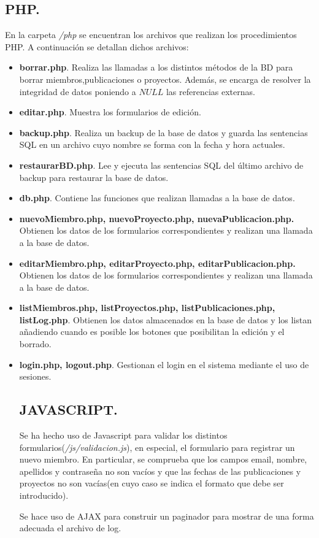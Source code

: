 \documentclass[a4paper, 11pt]{article} %
\begin{document}
\subsection{PHP.}
En la carpeta \emph{/php} se encuentran los archivos que realizan los procedimientos PHP. A continuación se detallan dichos archivos:
\begin{itemize}
	\item \textbf{borrar.php}. Realiza las llamadas a los distintos métodos de la BD para borrar miembros,publicaciones o proyectos. Además, se encarga de resolver la integridad de datos poniendo a $NULL$ las referencias externas. 
	\item \textbf{editar.php}. Muestra los formularios de edición.
	\item \textbf{backup.php}. Realiza un backup de la base de datos y guarda las sentencias SQL en un archivo cuyo nombre se forma con la fecha y hora actuales. 
	\item \textbf{restaurarBD.php}. Lee y ejecuta las sentencias SQL del último archivo de backup para restaurar la base de datos. 
	\item \textbf{db.php}. Contiene las funciones que realizan llamadas a la base de datos.
	\item \textbf{nuevoMiembro.php, nuevoProyecto.php, nuevaPublicacion.php.} Obtienen los datos de los formularios correspondientes y realizan una llamada a la base de datos.
	\item \textbf{editarMiembro.php, editarProyecto.php, editarPublicacion.php.} Obtienen los datos de los formularios correspondientes y realizan una llamada a la base de datos.
    \item \textbf{listMiembros.php, listProyectos.php, listPublicaciones.php, listLog.php}. Obtienen los datos almacenados en la base de datos y los listan añadiendo cuando es posible los botones que posibilitan la edición y el borrado.
    \item \textbf{login.php, logout.php}. Gestionan el login en el sistema mediante el uso de sesiones.
    \subsection{JAVASCRIPT.}
    Se ha hecho uso de Javascript para validar los distintos formularios(\emph{/js/validacion.js}), en especial, el formulario
	para registrar un nuevo miembro. En particular, se comprueba que los campos email, nombre, apellidos y contraseña no son vacíos y que las fechas de las publicaciones y proyectos no son vacías(en cuyo caso se indica el formato que debe ser introducido).
	
	\medskip
	
	Se hace uso de AJAX para construir un paginador para mostrar de una forma adecuada el archivo de log.
\end{itemize}
\end{document}
